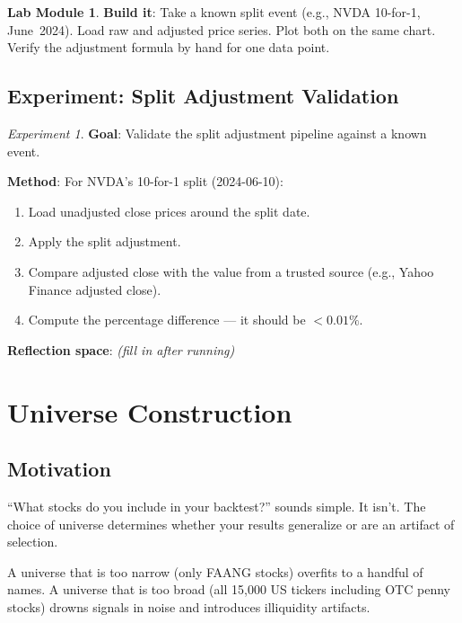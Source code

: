 \documentclass[a4paper, 11pt]{report}
\theoremstyle{definition}
\newtheorem{labmod}{Lab Module}[chapter]
\theoremstyle{remark}
\newtheorem{experiment}{Experiment}[chapter]
\begin{document}
\begin{labmod}
    \textbf{Build it}: Take a known split event (e.g., NVDA 10-for-1, June~2024).
    Load raw and adjusted price series.  Plot both on the same chart.  Verify the
    adjustment formula by hand for one data point.
\end{labmod}

\section{Experiment: Split Adjustment Validation}

\begin{experiment}
    \textbf{Goal}: Validate the split adjustment pipeline against a known event.

    \textbf{Method}: For NVDA's 10-for-1 split (2024-06-10):
    \begin{enumerate}
        \item Load unadjusted close prices around the split date.
        \item Apply the split adjustment.
        \item Compare adjusted close with the value from a trusted source
              (e.g., Yahoo Finance adjusted close).
        \item Compute the percentage difference --- it should be $< 0.01\%$.
    \end{enumerate}

    \textbf{Reflection space}: \emph{(fill in after running)}
\end{experiment}


\chapter{Universe Construction}
\label{ch:universe}

\section{Motivation}

``What stocks do you include in your backtest?'' sounds simple.  It isn't.  The
choice of universe determines whether your results generalize or are an artifact
of selection.

A universe that is too narrow (only FAANG stocks) overfits to a handful of names.
A universe that is too broad (all 15{,}000 US tickers including OTC penny stocks)
drowns signals in noise and introduces illiquidity artifacts.
\end{document}
